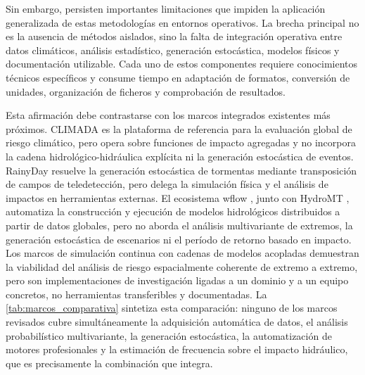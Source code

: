 Sin embargo, persisten importantes limitaciones que impiden la aplicación generalizada de estas metodologías en entornos operativos. La brecha principal no es la ausencia de métodos aislados, sino la falta de integración operativa entre datos climáticos, análisis estadístico, generación estocástica, modelos físicos y documentación utilizable. Cada uno de estos componentes requiere conocimientos técnicos específicos y consume tiempo en adaptación de formatos, conversión de unidades, organización de ficheros y comprobación de resultados.

Esta afirmación debe contrastarse con los marcos integrados existentes más próximos. CLIMADA \parencite{aznar2019climada} es la plataforma de referencia para la evaluación global de riesgo climático, pero opera sobre funciones de impacto agregadas y no incorpora la cadena hidrológico-hidráulica explícita ni la generación estocástica de eventos. RainyDay \parencite{wright2017rainyday} resuelve la generación estocástica de tormentas mediante transposición de campos de teledetección, pero delega la simulación física y el análisis de impactos en herramientas externas. El ecosistema wflow \parencite{vanverseveld2024wflow}, junto con HydroMT \parencite{eilander2023hydromt}, automatiza la construcción y ejecución de modelos hidrológicos distribuidos a partir de datos globales, pero no aborda el análisis multivariante de extremos, la generación estocástica de escenarios ni el período de retorno basado en impacto. Los marcos de simulación continua con cadenas de modelos acopladas \parencite{falter2015continuous} demuestran la viabilidad del análisis de riesgo espacialmente coherente de extremo a extremo, pero son implementaciones de investigación ligadas a un dominio y a un equipo concretos, no herramientas transferibles y documentadas. La \cref{tab:marcos_comparativa} sintetiza esta comparación: ninguno de los marcos revisados cubre simultáneamente la adquisición automática de datos, el análisis probabilístico multivariante, la generación estocástica, la automatización de motores profesionales y la estimación de frecuencia sobre el impacto hidráulico, que es precisamente la combinación que \hydra integra.

